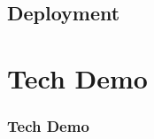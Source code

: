 \documentclass{beamer}
\begin{document}
\subsection{Deployment}
\begin{frame}

\end{frame}
\section{Tech Demo}
\begin{frame}
    \frametitle{Tech Demo}
\end{frame}
\end{document}

